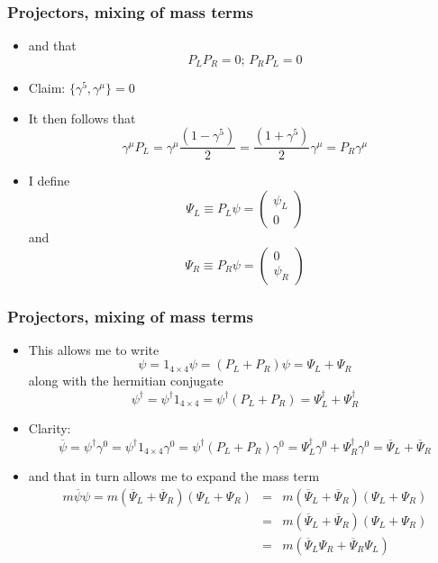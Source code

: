 \documentclass{beamer}
\begin{document}
\begin{frame}
	\frametitle{Projectors, mixing of mass terms}
	\begin{itemize}



\item
\pause
and that 
\[
P_{L}P_{R}=0;\,P_{R}P_{L}=0
\]
\pause
		\item Claim: $\{\gamma^{5},\gamma^{\mu}\}=0$
		\pause
		\item It then follows that 
		\pause
\[
\gamma^{\mu}P_{L}=\gamma^{\mu}\frac{\left(1-\gamma^{5}\right)}{2}=\frac{\left(1+\gamma^{5}\right)}{2}\gamma^{\mu}=P_{R}\gamma^{\mu}
\]
		\pause
		\item I define 
\[
\Psi_{L}\equiv P_{L}\psi=\left(\begin{array}{c}
\psi_{L}\\
0
\end{array}\right)
\]
\pause
and 
\[
\Psi_{R}\equiv P_{R}\psi=\left(\begin{array}{c}
0\\
\psi_{R}
\end{array}\right)
\]

	\end{itemize}
\end{frame}






\begin{frame}
	\frametitle{Projectors, mixing of mass terms}
	\begin{itemize}
		\item
This allows me to write 
\pause
\[
\psi=1_{4\times4}\psi=\left(P_{L}+P_{R}\right)\psi=\Psi_{L}+\Psi_{R}
\]
\pause
along with the hermitian conjugate 
\[
\psi^{\dagger}=\psi^{\dagger}1_{4\times4}=\psi^{\dagger}\left(P_{L}+P_{R}\right)=\Psi_{L}^{\dagger}+\Psi_{R}^{\dagger}
\]

		\item Clarity:
		\pause
\[
\overline{\psi}=\psi^{\dagger}\gamma^{0}=\psi^{\dagger}1_{4\times4}\gamma^{0}=\psi^{\dagger}\left(P_{L}+P_{R}\right)\gamma^{0}=\Psi_{L}^{\dagger}\gamma^{0}+\Psi_{R}^{\dagger}\gamma^{0}=\overline{\Psi}_{L}+\overline{\Psi}_{R}
\]
		\item and that in turn allows me to expand the mass term 
		\pause
\[
\begin{aligned}m\overline{\psi}\psi=m\left(\overline{\Psi}_{L}+\overline{\Psi}_{R}\right)\left(\Psi_{L}+\Psi_{R}\right) & = & m\left(\overline{\Psi}_{L}+\overline{\Psi}_{R}\right)\left(\Psi_{L}+\Psi_{R}\right)\\
 & = & m\left(\overline{\Psi}_{L}+\overline{\Psi}_{R}\right)\left(\Psi_{L}+\Psi_{R}\right)\\
 & = & m\left(\overline{\Psi}_{L}\Psi_{R}+\overline{\Psi}_{R}\Psi_{L}\right)
\end{aligned}
\]


	\end{itemize}
\end{frame}
\end{document}
